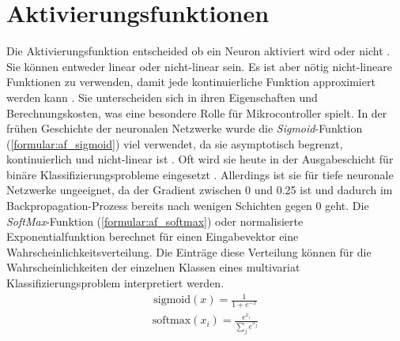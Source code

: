 \section{Aktivierungsfunktionen}
Die Aktivierungsfunktion entscheided ob ein Neuron aktiviert wird oder nicht \cite{nwankpa2018activation}.
Sie können entweder linear oder nicht-linear sein.
Es ist aber nötig nicht-lineare Funktionen zu verwenden, damit jede kontinuierliche Funktion approximiert werden kann \cite{apicella2021survey}.
Sie unterscheiden sich in ihren Eigenschaften und Berechnungskosten, was eine besondere Rolle für Mikrocontroller spielt.
\newline
\newline
In der frühen Geschichte der neuronalen Netzwerke wurde die \textit{Sigmoid}-Funktion (\ref{formular:af_sigmoid}) viel verwendet, da sie asymptotisch begrenzt,
kontinuierlich und nicht-linear ist \cite{apicella2021survey}.
Oft wird sie heute in der Ausgabeschicht für binäre Klassifizierungsprobleme eingesetzt \cite{nwankpa2018activation}.
Allerdings ist sie für tiefe neuronale Netzwerke ungeeignet, da der Gradient zwischen 0 und 0.25 ist und dadurch im
Backpropagation-Prozess bereits nach wenigen Schichten gegen 0 geht.
Die \textit{SoftMax}-Funktion (\ref{formular:af_softmax}) oder normalisierte Exponentialfunktion berechnet für einen Eingabevektor eine Wahrscheinlichkeitsverteilung.
Die Einträge diese Verteilung können für die Wahrscheinlichkeiten der einzelnen Klassen eines multivariat Klassifizierungsproblem interpretiert werden.
\begin{align}
    \label{formular:af_sigmoid}
    \text{sigmoid}(x) = \frac{1}{1 + e^{-x}}
\end{align}
\begin{align}
    \label{formular:af_softmax}
    \text{softmax}(x_i) = \frac{e^{x_i}}{\sum_j e^{x_j}}
\end{align}
